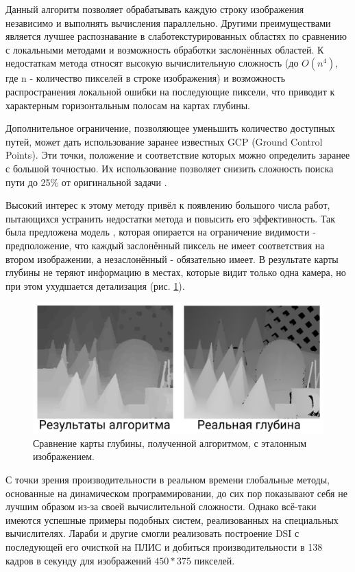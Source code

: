 Данный алгоритм позволяет обрабатывать каждую строку изображения независимо и выполнять вычисления параллельно. Другими преимуществами является лучшее распознавание в слаботекстурированных 
областях по сравнению с локальными методами и возможность обработки заслонённых областей.   %
К недостаткам метода относят высокую вычислительную сложность (до $O(n^4)$, где n - количество пикселей в строке изображения) и возможность распространения локальной ошибки на последующие пиксели, что приводит к характерным горизонтальным полосам на картах глубины. 

Дополнительное ограничение, позволяющее уменьшить количество доступных путей, может дать использование заранее известных GCP (Ground Control Points). Эти точки, положение и 
соответствие которых можно определить заранее с большой точностью. Их использование позволяет снизить сложность поиска пути до 25\% от оригинальной задачи \cite{DSI}. 

Высокий интерес к этому методу привёл к появлению большого числа работ, пытающихся устранить недостатки метода и повысить его эффективность. Так была предложена модель \cite{symmetric}, которая 
опирается на ограничение видимости - предположение, что каждый заслонённый пиксель не имеет соответствия на втором изображении, а незаслонённый - обязательно имеет. В результате карты глубины не теряют информацию 
в местах, которые видит только одна камера, но при этом ухудшается детализация (рис. \ref{pic:symmetry}). 
\begin{figure}[H]
	\begin{center}
		\includegraphics[scale=0.3]{pics/symmetric_rus.png}
		\caption{ Сравнение карты глубины, полученной алгоритмом, с эталонным изображением. } 
		\label{pic:symmetry} %
	\end{center}
\end{figure}

С точки зрения производительности в реальном времени глобальные методы, основанные на динамическом программировании, до сих пор показывают себя не лучшим образом из-за своей вычислительной сложности.
Однако всё-таки имеются успешные примеры подобных систем, реализованных на специальных вычислителях. Лараби и другие \cite{FPGA_DSI} смогли реализовать построение DSI с последующей его очисткой на ПЛИС и добиться производительности в 138 кадров в 
секунду для изображений $450*375$ пикселей. 

